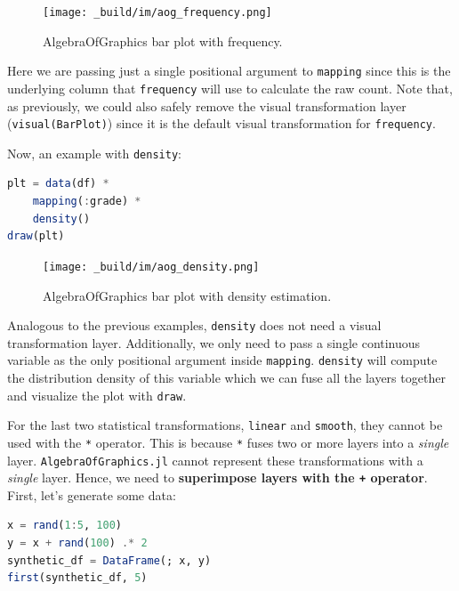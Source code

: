 \documentclass[
  notoc %
]{tufte-book}
\newcommand{\passthrough}[1]{#1}
\begin{document}
\begin{figure}
\hypertarget{fig:aog_frequency}{%
\centering
\texttt{[image: \_build/im/aog\_frequency.png]}
\caption{AlgebraOfGraphics bar plot with
frequency.}\label{fig:aog_frequency}
}
\end{figure}

Here we are passing just a single positional argument to
\passthrough{\lstinline!mapping!} since this is the underlying column
that \passthrough{\lstinline!frequency!} will use to calculate the raw
count. Note that, as previously, we could also safely remove the visual
transformation layer (\passthrough{\lstinline!visual(BarPlot)!}) since
it is the default visual transformation for
\passthrough{\lstinline!frequency!}.

Now, an example with \passthrough{\lstinline!density!}:

\begin{lstlisting}[language=Julia]
plt = data(df) *
    mapping(:grade) *
    density()
draw(plt)
\end{lstlisting}

\begin{figure}
\hypertarget{fig:aog_density}{%
\centering
\texttt{[image: \_build/im/aog\_density.png]}
\caption{AlgebraOfGraphics bar plot with density
estimation.}\label{fig:aog_density}
}
\end{figure}

Analogous to the previous examples, \passthrough{\lstinline!density!}
does not need a visual transformation layer. Additionally, we only need
to pass a single continuous variable as the only positional argument
inside \passthrough{\lstinline!mapping!}.
\passthrough{\lstinline!density!} will compute the distribution density
of this variable which we can fuse all the layers together and visualize
the plot with \passthrough{\lstinline!draw!}.

For the last two statistical transformations,
\passthrough{\lstinline!linear!} and \passthrough{\lstinline!smooth!},
they cannot be used with the \passthrough{\lstinline!*!} operator. This
is because \passthrough{\lstinline!*!} fuses two or more layers into a
\emph{single} layer. \passthrough{\lstinline!AlgebraOfGraphics.jl!}
cannot represent these transformations with a \emph{single} layer.
Hence, we need to \textbf{superimpose layers with the
\passthrough{\lstinline!+!} operator}. First, let's generate some data:

\begin{lstlisting}[language=Julia]
x = rand(1:5, 100)
y = x + rand(100) .* 2
synthetic_df = DataFrame(; x, y)
first(synthetic_df, 5)
\end{lstlisting}
\end{document}
